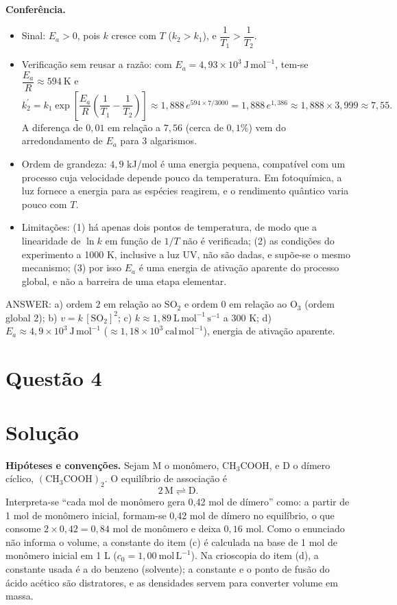 \documentclass{article}%
\begin{document}
\textbf{Conferência.}
\begin{itemize}
\item Sinal: $E_a > 0$, pois $k$ cresce com $T$ ($k_2 > k_1$), e $\dfrac{1}{T_1} > \dfrac{1}{T_2}$.
\item Verificação sem reusar a razão: com $E_a = 4{,}93\times 10^{3}\ \mathrm{J\,mol^{-1}}$, tem-se $\dfrac{E_a}{R} \approx 594\ \mathrm{K}$ e
\[
k_{2}^{\prime} = k_1\exp\!\left[\frac{E_a}{R}\left(\frac{1}{T_1}-\frac{1}{T_2}\right)\right] \approx 1{,}888\,e^{594\times 7/3000} = 1{,}888\,e^{1{,}386} \approx 1{,}888 \times 3{,}999 \approx 7{,}55.
\]
A diferença de $0{,}01$ em relação a $7{,}56$ (cerca de $0{,}1\%$) vem do arredondamento de $E_a$ para 3 algarismos.
\item Ordem de grandeza: $4{,}9$ kJ/mol é uma energia pequena, compatível com um processo cuja velocidade depende pouco da temperatura. Em fotoquímica, a luz fornece a energia para as espécies reagirem, e o rendimento quântico varia pouco com $T$.
\item Limitações: (1) há apenas dois pontos de temperatura, de modo que a linearidade de $\ln k$ em função de $1/T$ não é verificada; (2) as condições do experimento a 1000 K, inclusive a luz UV, não são dadas, e supõe-se o mesmo mecanismo; (3) por isso $E_a$ é uma energia de ativação aparente do processo global, e não a barreira de uma etapa elementar.
\end{itemize}

ANSWER: a) ordem $2$ em relação ao $\mathrm{SO_2}$ e ordem $0$ em relação ao $\mathrm{O_3}$ (ordem global $2$); b) $v = k\,[\mathrm{SO_2}]^{2}$; c) $k \approx 1{,}89\ \mathrm{L\,mol^{-1}\,s^{-1}}$ a 300 K; d) $E_a \approx 4{,}9 \times 10^{3}\ \mathrm{J\,mol^{-1}}$ ($\approx 1{,}18 \times 10^{3}\ \mathrm{cal\,mol^{-1}}$), energia de ativação aparente.%
\newpage%
\section*{Questão 4}

\section*{Solução}

\textbf{Hipóteses e convenções.} Sejam $\mathrm{M}$ o monômero, $\mathrm{CH_3COOH}$, e $\mathrm{D}$ o dímero cíclico, $(\mathrm{CH_3COOH})_2$. O equilíbrio de associação é
\[
2\,\mathrm{M} \rightleftharpoons \mathrm{D}.
\]
Interpreta-se ``cada mol de monômero gera 0,42 mol de dímero'' como: a partir de 1 mol de monômero inicial, formam-se 0,42 mol de dímero no equilíbrio, o que consome $2\times0{,}42=0{,}84$ mol de monômero e deixa $0{,}16$ mol. Como o enunciado não informa o volume, a constante do item (c) é calculada na base de 1 mol de monômero inicial em 1 L ($c_0=1{,}00\ \mathrm{mol\,L^{-1}}$). Na crioscopia do item (d), a constante usada é a do benzeno (solvente); a constante e o ponto de fusão do ácido acético são distratores, e as densidades servem para converter volume em massa.
\end{document}
